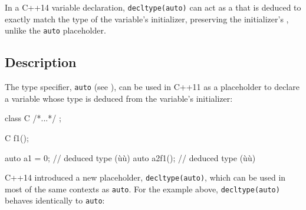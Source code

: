 


\label{deducing-types-using-decltype-semantics}
\setcounter{table}{0}
\setcounter{footnote}{0}
\setcounter{lstlisting}{0}


In a C++14 variable declaration, \lstinline!decltype(auto)! can act as a
 that is deduced to exactly match the type of
the variable's initializer, preserving the initializer's , unlike the \lstinline!auto! placeholder.

\subsection[Description]{Description}\label{description}

The type specifier, \lstinline!auto! (see ),
can be used in C++11 as a placeholder to declare a variable whose type
is deduced from the variable's initializer:

\begin{emcppslisting}[emcppsbatch=e1]
class C { /*...*/ };

C f1();

auto a1 = 0;    // deduced type (ù{}ù)
auto a2{f1()};  // deduced type (ù{}ù)
\end{emcppslisting}
    

C++14 introduced a new placeholder, \lstinline!decltype(auto)!, which can
be used in most of the same contexts as \lstinline!auto!. For the example
above, \lstinline!decltype(auto)! behaves identically to \lstinline!auto!:

